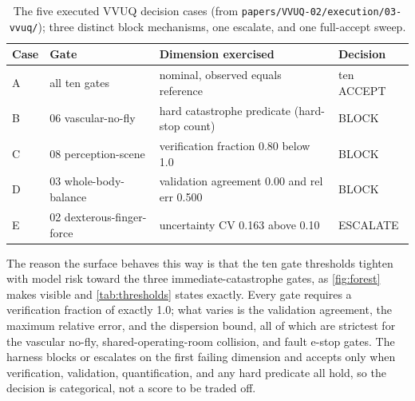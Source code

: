 \begin{table}[H]
\caption{The five executed VVUQ decision cases (from
\texttt{papers/VVUQ-02/execution/03-vvuq/}); three distinct block mechanisms, one
escalate, and one full-accept sweep.}
\label{tab:decisionsurface}
\centering
\footnotesize
\begin{tabularx}{\textwidth}{L{1cm} L{3.4cm} Y L{1.9cm}}
\toprule
\textbf{Case} & \textbf{Gate} & \textbf{Dimension exercised} & \textbf{Decision} \\
\midrule
A & all ten gates & nominal, observed equals reference & ten ACCEPT \\
B & 06 vascular-no-fly & hard catastrophe predicate (hard-stop count) & BLOCK \\
C & 08 perception-scene & verification fraction 0.80 below 1.0 & BLOCK \\
D & 03 whole-body-balance & validation agreement 0.00 and rel err 0.500 & BLOCK \\
E & 02 dexterous-finger-force & uncertainty CV 0.163 above 0.10 & ESCALATE \\
\bottomrule
\end{tabularx}
\end{table}

The reason the surface behaves this way is that the ten gate thresholds tighten
with model risk toward the three immediate-catastrophe gates, as
\autoref{fig:forest} makes visible and \autoref{tab:thresholds} states exactly.
Every gate requires a verification fraction of exactly 1.0; what varies is the
validation agreement, the maximum relative error, and the dispersion bound, all
of which are strictest for the vascular no-fly, shared-operating-room collision,
and fault e-stop gates. The harness blocks or escalates on the first failing
dimension and accepts only when verification, validation, quantification, and any
hard predicate all hold, so the decision is categorical, not a score to be traded
off.

